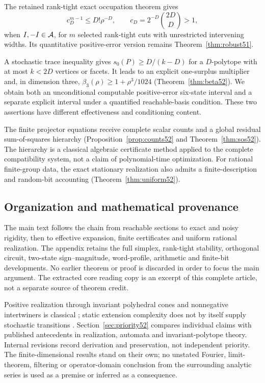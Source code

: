 The retained rank-tight exact occupation theorem gives
\begin{equation}\label{eq:intro-budget50}
 c_D^{m-1}\le D!\rho^{-D},\qquad c_D=2^{-D}\binom{2D}{D}>1,
\end{equation}
when $I,-I\in\mathcal A$, for $m$ selected rank-tight cuts with unrestricted
intervening widths. Its quantitative positive-error version remains
Theorem~\ref{thm:robust51}.

A stochastic trace inequality gives
$s_0(P)\ge D/(k-D)$ for a $D$-polytope with at most $k<2D$ vertices
or facets. It leads to an explicit one-surplus multiplier and, in
dimension three, $\beta_3(\rho)\ge1+\rho^3/1024$
(Theorem~\ref{thm:beta52}). We obtain both an unconditional computable
positive-error six-state interval and a separate explicit interval
under a quantified reachable-basis condition. These two assertions
have different effectiveness and conditioning content.

The finite projector equations receive complete scalar counts and a
global residual sum-of-squares hierarchy
(Proposition~\ref{prop:counts52} and Theorem~\ref{thm:sos52}). The
hierarchy is a classical algebraic certificate method applied to the
complete compatibility system, not a claim of polynomial-time
optimization. For rational finite-group data, the exact stationary
realization also admits a finite-description and random-bit accounting
(Theorem~\ref{thm:uniform52}).

\subsection{Organization and mathematical provenance}
The main text follows the chain from reachable sections to exact and
noisy rigidity, then to effective expansion, finite certificates and
uniform rational realization. The appendix retains the full simplex,
rank-tight stability, orthogonal circuit, two-state sign--magnitude,
word-profile, arithmetic and finite-bit developments. No earlier
theorem or proof is discarded in order to focus the main argument.
The extracted core reading copy is an excerpt of this complete
article, not a separate source of theorem credit.

Positive realization through invariant polyhedral cones and
nonnegative intertwiners is classical \cite{BF04,BF03}; static extension
complexity does not by itself supply stochastic transitions
\cite{Yannakakis}. Section~\ref{sec:priority52} compares individual
claims with published antecedents in realization, automata and
invariant-polytope theory. Internal revisions record derivation and
preservation, not independent priority. The finite-dimensional results
stand on their own; no unstated Fourier, limit-theorem, filtering or
operator-domain conclusion from the surrounding analytic series is
used as a premise or inferred as a consequence.
